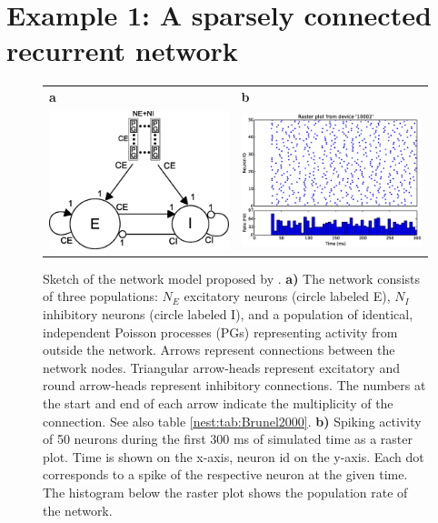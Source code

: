 \documentclass{article}
\begin{document}
\section{Example 1: A sparsely connected recurrent network}
\label{nest:sec:brunel}
\begin{figure}[!htb]
\centering
\begin{tabular}{ll}
\textbf{a} & \textbf{b}\\
\includegraphics[width=0.4\linewidth]{figures/brunel_detailed_external_single2.eps}&
\includegraphics[width=0.5\linewidth]{figures/brunel_interactive.eps}
\end{tabular}

\caption{\label{nest:fig:brunel2000} Sketch of the network model
  proposed by \citet{Brunel00}. \textbf{a)} The network consists of
  three populations: $N_E$ excitatory neurons (circle labeled E), $N_I$
  inhibitory neurons (circle labeled I), and a
  population of identical, independent Poisson processes (PGs) representing
  activity from outside the network. Arrows represent connections
  between the network nodes. Triangular arrow-heads represent
  excitatory and round arrow-heads represent inhibitory
  connections. The numbers at the start and end of each arrow indicate
  the multiplicity of the connection. See also table
  \ref{nest:tab:Brunel2000}. \textbf{b)} Spiking activity of 50 neurons
  during the first 300 ms of simulated time as a raster plot. Time is
  shown on the x-axis, neuron id on the y-axis. Each dot corresponds
  to a spike of the respective neuron at the given time. The histogram
  below the raster plot shows the population rate of the network.}
\end{figure}
\end{document}
